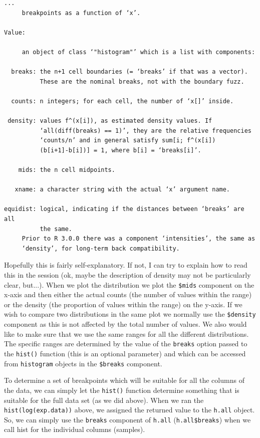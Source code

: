 \documentclass[11pt]{article}
\begin{document}
\begin{verbatim}
...
     breakpoints as a function of ‘x’.

Value:

     an object of class ‘"histogram"’ which is a list with components:

  breaks: the n+1 cell boundaries (= ‘breaks’ if that was a vector).
          These are the nominal breaks, not with the boundary fuzz.

  counts: n integers; for each cell, the number of ‘x[]’ inside.

 density: values f^(x[i]), as estimated density values. If
          ‘all(diff(breaks) == 1)’, they are the relative frequencies
          ‘counts/n’ and in general satisfy sum[i; f^(x[i])
          (b[i+1]-b[i])] = 1, where b[i] = ‘breaks[i]’.

    mids: the n cell midpoints.

   xname: a character string with the actual ‘x’ argument name.

equidist: logical, indicating if the distances between ‘breaks’ are all
          the same.
     Prior to R 3.0.0 there was a component ‘intensities’, the same as
     ‘density’, for long-term back compatibility.
\end{verbatim}

Hopefully this is fairly self-explanatory. If not, I can try to explain how
to read this in the session (ok, maybe the description of density may not
be particularly clear, but...). When we plot the distribution we plot the
\texttt{\$mids} component on the x-axis and then either the actual counts
(the number of values within the range) or the density (the proportion of
values within the range) on the y-axis. If we wish to compare two distributions
in the same plot we normally use the \texttt{\$density} component as
this is not affected by the total number of values. We also would like to
make sure that we use the same ranges for all the different distributions. The
specific ranges are determined by the value of the \texttt{breaks} option
passed to the \texttt{hist()} function (this is an optional parameter) and
which can be accessed from \texttt{histogram} objects in the \texttt{\$breaks}
component.

To determine a set of breakpoints which will be suitable for all the
columns of the data, we can simply let the \texttt{hist()} function
determine something that is suitable for the full data set (as we
did above). When we ran the \texttt{hist(log(exp.data))} above, we
assigned the returned value to the \texttt{h.all} object. So, we can
simply use the \texttt{breaks} component of \texttt{h.all} 
(\texttt{h.all\$breaks}) when we call hist for the individual columns (samples).
\end{document}

